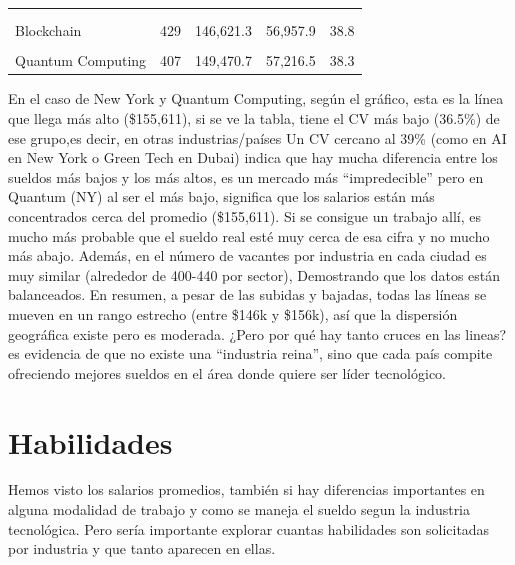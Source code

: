 \documentclass[oneside,11pt]{Latex/Classes/PhDthesisPSnPDF}
\begin{document}
\begin{longtable}{lrrrr}
\multicolumn{5}{p{\linewidth}}{\cellcolor[HTML]{F2F2F2}{\textbf{Tokyo}}}\\
\hspace{1em}\cellcolor{gray!10}{AI} & \cellcolor{gray!10}{427} & \cellcolor{gray!10}{148,499.4} & \cellcolor{gray!10}{57,079.3} & \cellcolor{gray!10}{38.4}\\
\hspace{1em}Blockchain & 429 & 146,621.3 & 56,957.9 & 38.8\\
\hspace{1em}\cellcolor{gray!10}{Green Tech} & \cellcolor{gray!10}{410} & \cellcolor{gray!10}{147,323.6} & \cellcolor{gray!10}{56,696.7} & \cellcolor{gray!10}{38.5}\\
\hspace{1em}Quantum Computing & 407 & 149,470.7 & 57,216.5 & 38.3\\
\bottomrule
\end{longtable}
\endgroup{}

En el caso de New York y Quantum Computing, según el gráfico, esta es la
línea que llega más alto (\$155,611), si se ve la tabla, tiene el CV más
bajo (36.5\%) de ese grupo,es decir, en otras industrias/países Un CV
cercano al 39\% (como en AI en New York o Green Tech en Dubai) indica
que hay mucha diferencia entre los sueldos más bajos y los más altos, es
un mercado más ``impredecible'' pero en Quantum (NY) al ser el más bajo,
significa que los salarios están más concentrados cerca del promedio
(\$155,611). Si se consigue un trabajo allí, es mucho más probable que
el sueldo real esté muy cerca de esa cifra y no mucho más abajo. Además,
en el número de vacantes por industria en cada ciudad es muy similar
(alrededor de 400-440 por sector), Demostrando que los datos están
balanceados. En resumen, a pesar de las subidas y bajadas, todas las
líneas se mueven en un rango estrecho (entre \$146k y \$156k), así que
la dispersión geográfica existe pero es moderada. ¿Pero por qué hay
tanto cruces en las lineas? es evidencia de que no existe una
``industria reina'', sino que cada país compite ofreciendo mejores
sueldos en el área donde quiere ser líder tecnológico.

\newpage

\section{Habilidades}

Hemos visto los salarios promedios, también si hay diferencias
importantes en alguna modalidad de trabajo y como se maneja el sueldo
segun la industria tecnológica. Pero sería importante explorar cuantas
habilidades son solicitadas por industria y que tanto aparecen en ellas.
\end{document}
